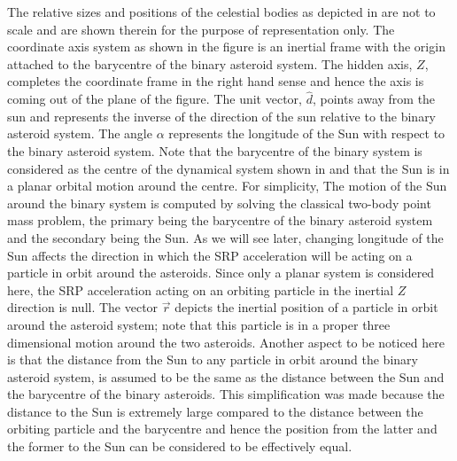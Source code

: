 The relative sizes and positions of the celestial bodies as depicted in  are not to scale and are shown therein for the purpose of representation only. The coordinate axis system as shown in the figure is an inertial frame with the origin attached to the barycentre of the binary asteroid system. The hidden axis, $Z$, completes the coordinate frame in the right hand sense and hence the axis is coming out of the plane of the figure. The unit vector, $\hat{d}$, points away from the sun and represents the inverse of the direction of the sun relative to the binary asteroid system. The angle $\alpha$ represents the longitude of the Sun with respect to the binary asteroid system. Note that the barycentre of the binary system is considered as the centre of the dynamical system shown in  and that the Sun is in a planar orbital motion around the centre. For simplicity, The motion of the Sun around the binary system is computed by solving the classical two-body point mass problem, the primary being the barycentre of the binary asteroid system and the secondary being the Sun. As we will see later, changing longitude of the Sun affects the direction in which the \gls{SRP} acceleration will be acting on a particle in orbit around the asteroids. Since only a planar system is considered here, the \gls{SRP} acceleration acting on an orbiting particle in the inertial $Z$ direction is null. The vector $\overrightarrow{r}$ depicts the inertial position of a particle in orbit around the asteroid system; note that this particle is in a proper three dimensional motion around the two asteroids. Another aspect to be noticed here is that the distance from the Sun to any particle in orbit around the binary asteroid system, is assumed to be the same as the distance between the Sun and the barycentre of the binary asteroids. This simplification was made because the distance to the Sun is extremely large compared to the distance between the orbiting particle and the barycentre and hence the position from the latter and the former to the Sun can be considered to be effectively equal.

